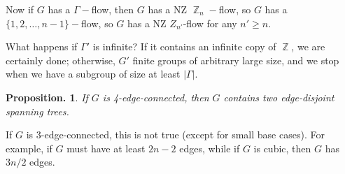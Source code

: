 \documentclass[11pt, a4paper]{memoir}
\DeclareMathOperator{\Z}{{\mathbb{Z}}}
\theoremstyle{change}
\newtheorem{proposition}[theorem]{Proposition.}
\theoremstyle{plain}
\theoremstyle{nonumberplain}
\numberwithin{equation}{section}
\begin{document}
Now if $G$ has a $\Gamma-$flow, then $G$ has a NZ $\Z_n-$flow, so $G$ has a $\{1,2,\ldots,n-1\}-$flow, so $G$ has a NZ $Z_{n'}$-flow for any $n'\geq n$.

What happens if $\Gamma'$ is infinite?
If it contains an infinite copy of $\Z$, we are certainly done; otherwise, $G'$ finite groups of arbitrary large size, and we stop when we have a subgroup of size at least $|\Gamma|$.

\begin{proposition}
    If $G$ is 4-edge-connected, then $G$ contains two edge-disjoint spanning trees.
\end{proposition}
If $G$ is 3-edge-connected, this is not true (except for small base cases).
For example, if $G$ must have at least $2n-2$ edges, while if $G$ is cubic, then $G$ has $3n/2$ edges.
\end{document}
